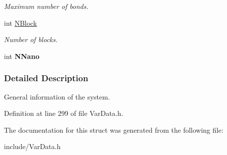 \begin{DoxyCompactItemize}
\begin{DoxyCompactList}\small\item\em \-Maximum number of bonds. \end{DoxyCompactList}\item 
\hypertarget{structGENERAL_a6613c7ace95c4bff9b80a9bfd8f4a9f8}{int \hyperlink{structGENERAL_a6613c7ace95c4bff9b80a9bfd8f4a9f8}{\-N\-Block}}\label{structGENERAL_a6613c7ace95c4bff9b80a9bfd8f4a9f8}

\begin{DoxyCompactList}\small\item\em \-Number of blocks. \end{DoxyCompactList}\item 
\hypertarget{structGENERAL_a41701680890bf48215ba29ba50d61caa}{int {\bfseries \-N\-Nano}}\label{structGENERAL_a41701680890bf48215ba29ba50d61caa}

\end{DoxyCompactItemize}


\subsubsection{\-Detailed \-Description}
\-General information of the system. 

\-Definition at line 299 of file \-Var\-Data.\-h.



\-The documentation for this struct was generated from the following file\-:\begin{DoxyCompactItemize}
\item 
include/\-Var\-Data.\-h\end{DoxyCompactItemize}
